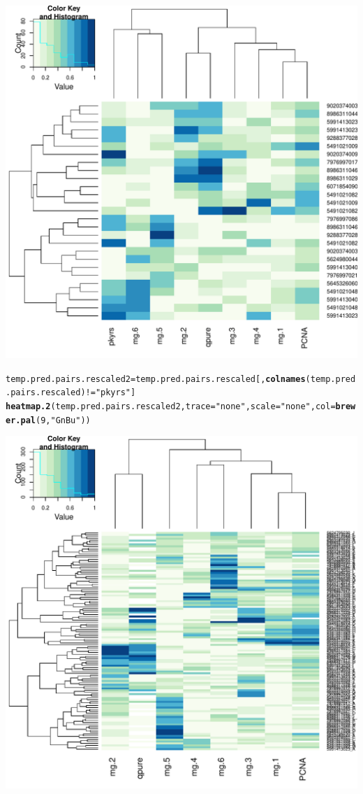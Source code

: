 \documentclass{article}\usepackage[]{graphicx}\usepackage[]{color}
\makeatletter
\def\maxwidth{ %
  \ifdim\Gin@nat@width>\linewidth
    \linewidth
  \else
    \Gin@nat@width
  \fi
}
\newcommand{\hlnum}[1]{\textcolor[rgb]{0.686,0.059,0.569}{#1}}%
\newcommand{\hlstr}[1]{\textcolor[rgb]{0.192,0.494,0.8}{#1}}%
\newcommand{\hlopt}[1]{\textcolor[rgb]{0,0,0}{#1}}%
\newcommand{\hlstd}[1]{\textcolor[rgb]{0.345,0.345,0.345}{#1}}%
\newcommand{\hlkwb}[1]{\textcolor[rgb]{0.69,0.353,0.396}{#1}}%
\newcommand{\hlkwc}[1]{\textcolor[rgb]{0.333,0.667,0.333}{#1}}%
\newcommand{\hlkwd}[1]{\textcolor[rgb]{0.737,0.353,0.396}{\textbf{#1}}}%
\newenvironment{kframe}{%
 \def\at@end@of@kframe{}%
 \ifinner\ifhmode%
  \def\at@end@of@kframe{\end{minipage}}%
  \begin{minipage}{\columnwidth}%
 \fi\fi%
 \def\FrameCommand##1{\hskip\@totalleftmargin \hskip-\fboxsep
 \colorbox{shadecolor}{##1}\hskip-\fboxsep
     \hskip-\linewidth \hskip-\@totalleftmargin \hskip\columnwidth}%
 \MakeFramed {\advance\hsize-\width
   \@totalleftmargin\z@ \linewidth\hsize
   \@setminipage}}%
 {\par\unskip\endMakeFramed%
 \at@end@of@kframe}
\newenvironment{knitrout}{}{} %
\makeatother
\begin{document}
\begin{knitrout}
{\centering \includegraphics[width=\maxwidth]{figure/metagene-pairs-3} 

}


\begin{kframe}\begin{alltt}
\hlstd{temp.pred.pairs.rescaled2} \hlkwb{=} \hlstd{temp.pred.pairs.rescaled[,}\hlkwd{colnames}\hlstd{(temp.pred.pairs.rescaled)} \hlopt{!=} \hlstr{"pkyrs"}\hlstd{]}
\hlkwd{heatmap.2}\hlstd{(temp.pred.pairs.rescaled2,} \hlkwc{trace} \hlstd{=} \hlstr{"none"}\hlstd{,} \hlkwc{scale} \hlstd{=} \hlstr{"none"}\hlstd{,} \hlkwc{col} \hlstd{=} \hlkwd{brewer.pal}\hlstd{(}\hlnum{9}\hlstd{,} \hlstr{"GnBu"}\hlstd{))}
\end{alltt}
\end{kframe}

{\centering \includegraphics[width=\maxwidth]{figure/metagene-pairs-4} 

}
\end{knitrout}
\end{document}
